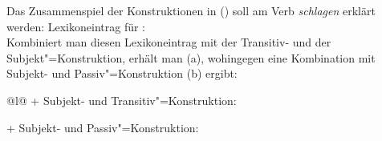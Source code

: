 Das Zusammenspiel der Konstruktionen in () soll am Verb \emph{schlagen} erklärt werden:
\ea
Lexikoneintrag für :\\
\z
Kombiniert man diesen Lexikoneintrag mit der Transitiv- und der Subjekt"=Konstruktion,
erhält man (a), wohingegen eine Kombination mit Subjekt- und Passiv"=Konstruktion
(b) ergibt:
\eal
\label{ex-schlagen-linking}
\ex 
\begin{tabular}[t]{@{}l@{}}
 + Subjekt- und Transitiv"=Konstruktion:\\
\end{tabular}
\ex {} + Subjekt- und Passiv"=Konstruktion:\\
